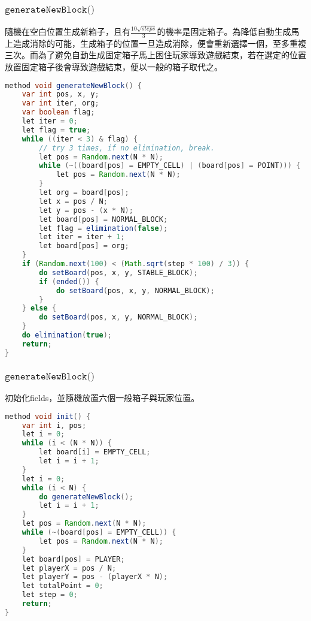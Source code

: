 \documentclass[pstricks, 12pt, a4paper]{article}
\begin{document}
    \subsubsection{$\texttt{generateNewBlock()}$}
      隨機在空白位置生成新箱子，且有$\frac{10\sqrt{steps}}{3}$的機率是固定箱子。為降低自動生成馬上造成消除的可能，生成箱子的位置一旦造成消除，便會重新選擇一個，至多重複三次。而為了避免自動生成固定箱子馬上困住玩家導致遊戲結束，若在選定的位置放置固定箱子後會導致遊戲結束，便以一般的箱子取代之。
      \begin{lstlisting}[language=Java, frame=single]
method void generateNewBlock() {
    var int pos, x, y;
    var int iter, org;
    var boolean flag;
    let iter = 0;
    let flag = true;
    while ((iter < 3) & flag) {
        // try 3 times, if no elimination, break.
        let pos = Random.next(N * N);
        while (~((board[pos] = EMPTY_CELL) | (board[pos] = POINT))) {
            let pos = Random.next(N * N);
        }
        let org = board[pos];
        let x = pos / N;
        let y = pos - (x * N);
        let board[pos] = NORMAL_BLOCK;
        let flag = elimination(false);
        let iter = iter + 1;
        let board[pos] = org;
    }
    if (Random.next(100) < (Math.sqrt(step * 100) / 3)) {
        do setBoard(pos, x, y, STABLE_BLOCK);
        if (ended()) {
            do setBoard(pos, x, y, NORMAL_BLOCK);
        }
    } else {
        do setBoard(pos, x, y, NORMAL_BLOCK);
    }
    do elimination(true);
    return;
}
      \end{lstlisting}
    \subsubsection{$\texttt{generateNewBlock()}$}
      初始化fields，並隨機放置六個一般箱子與玩家位置。
      \begin{lstlisting}[language=Java, frame=single]
method void init() {
    var int i, pos;
    let i = 0;
    while (i < (N * N)) {
        let board[i] = EMPTY_CELL;
        let i = i + 1;
    }
    let i = 0;
    while (i < N) {
        do generateNewBlock();
        let i = i + 1;
    }
    let pos = Random.next(N * N);
    while (~(board[pos] = EMPTY_CELL)) {
        let pos = Random.next(N * N);
    }
    let board[pos] = PLAYER;
    let playerX = pos / N;
    let playerY = pos - (playerX * N);
    let totalPoint = 0;
    let step = 0;
    return;
}
      \end{lstlisting}
\end{document}
